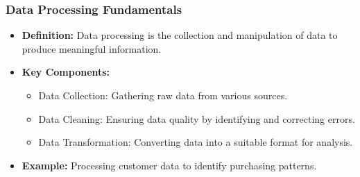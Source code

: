 \documentclass[aspectratio=169]{beamer}
\begin{document}
\begin{frame}[fragile]
    \frametitle{Data Processing Fundamentals}
    \begin{itemize}
        \item \textbf{Definition:} Data processing is the collection and manipulation of data to produce meaningful information.
        \item \textbf{Key Components:}
        \begin{itemize}
            \item Data Collection: Gathering raw data from various sources.
            \item Data Cleaning: Ensuring data quality by identifying and correcting errors.
            \item Data Transformation: Converting data into a suitable format for analysis.
        \end{itemize}
        \item \textbf{Example:} Processing customer data to identify purchasing patterns.
    \end{itemize}
\end{frame}
\end{document}
